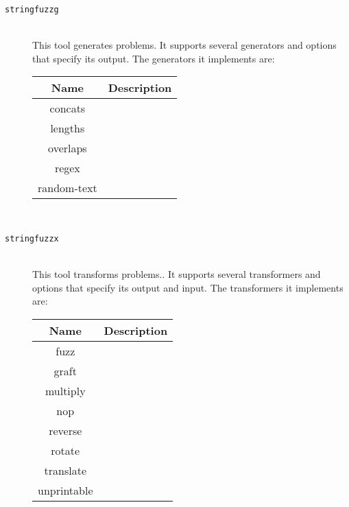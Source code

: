     \begin{description}

        \item[\texttt{stringfuzzg}] \hfill \\
            This tool generates \smt{} problems. It supports several generators and options that specify its output. The generators it implements are: \\


            \begin{tabular}{|c|c|}
                \hline
                \textbf{Name} & \textbf{Description} \\ \hline
                concats       & \\ \hline
                lengths       & \\ \hline
                overlaps      & \\ \hline
                regex         & \\ \hline
                random-text   & \\ \hline
            \end{tabular}

            \hfill \\

        \item[\texttt{stringfuzzx}] \hfill \\

            This tool transforms \smt{} problems.. It supports several transformers and options that specify its output and input.  The transformers it implements are: \\


            \begin{tabular}{|c|c|}
                \hline
                \textbf{Name} & \textbf{Description} \\ \hline
                fuzz          & \\ \hline
                graft         & \\ \hline
                multiply      & \\ \hline
                nop           & \\ \hline
                reverse       & \\ \hline
                rotate        & \\ \hline
                translate     & \\ \hline
                unprintable   & \\ \hline
            \end{tabular}


\end{description}
